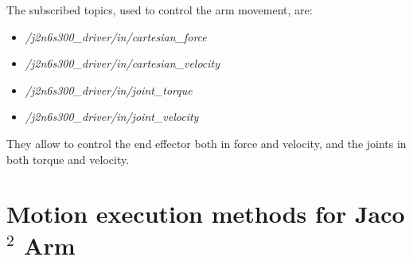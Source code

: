 The subscribed topics, used to control the arm movement, are:
\begin{itemize}
	\item \textit{/j2n6s300\_driver/in/cartesian\_force}
	\item \textit{/j2n6s300\_driver/in/cartesian\_velocity}
	\item \textit{/j2n6s300\_driver/in/joint\_torque}
	\item \textit{/j2n6s300\_driver/in/joint\_velocity}
\end{itemize}
They allow to control the end effector both in force and velocity, and the joints in both torque and velocity.


\section{Motion execution methods for Jaco$^2$ Arm}

